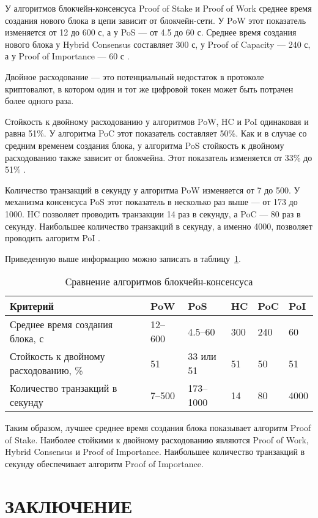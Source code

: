 \documentclass{bmstu}
\begin{document}
У алгоритмов блокчейн-консенсуса Proof of Stake и Proof of Work среднее время создания нового блока в цепи зависит от блокчейн-сети. 
У PoW этот показатель изменяется от 12 до 600 с, а у PoS --- от 4.5 до 60 с. 
Среднее время создания нового блока у Hybrid Consensus составляет 300 с, у Proof of Capacity --- 240 с, а у Proof of Importance --- 60 с \cite{Auhl2022}.

Двойное расходование --- это потенциальный недостаток в протоколе криптовалют, в котором один и тот же цифровой токен может быть потрачен более одного раза.

Стойкость к двойному расходованию у алгоритмов PoW, HC и PoI одинаковая и равна 51\%. 
У алгоритма PoC этот показатель составляет 50\%. 
Как и в случае со средним временем создания блока, у алгоритма PoS стойкость к двойному расходованию также зависит от блокчейна. 
Этот показатель изменяется от 33\% до 51\% \cite{Auhl2022}.

Количество транзакций в секунду у алгоритма PoW изменяется от 7 до 500. 
У механизма консенсуса PoS этот показатель в несколько раз выше --- от 173 до 1000. 
HC позволяет проводить транзакции 14 раз в секунду, а PoC --- 80 раз в секунду. 
Наибольшее количество транзакций в секунду, а именно 4000, позволяет проводить алгоритм PoI \cite{Auhl2022}.

Приведенную выше информацию можно записать в таблицу~\ref{tabular:comparison}. 

\begin{table}[H]
\caption{Сравнение алгоритмов блокчейн-консенсуса}
\label{tabular:comparison}
\begin{tabular}{|p{3cm}|p{2cm}|p{2.4cm}|p{}|p{}|p{}|}
\hline
\textbf{Критерий} & \textbf{PoW} & \textbf{PoS} & \textbf{HC} & \textbf{PoC} & \textbf{PoI}
\tabularnewline
\hline
Среднее время создания блока, с & 12--600 & 4.5--60 & 300 & 240 & 60
\tabularnewline
\hline
Стойкость к двойному расходованию, \% & 51 & 33 или 51 & 51 & 50 & 51
\tabularnewline
\hline
Количество транзакций в секунду & 7--500 & 173--1000 & 14 & 80 & 4000
\tabularnewline
\hline
\end{tabular}
\end{table}

Таким образом, лучшее среднее время создания блока показывает алгоритм Proof of Stake. 
Наиболее стойкими к двойному расходованию являются Proof of Work, Hybrid Consensus и Proof of Importance. 
Наибольшее количество транзакций в секунду обеспечивает алгоритм Proof of Importance.

{\centering \chapter*{ЗАКЛЮЧЕНИЕ}}
\end{document}
